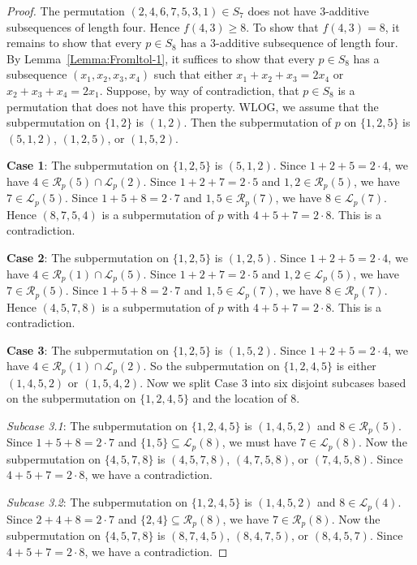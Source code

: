 \documentclass[10pt,a4paper]{amsart}
\begin{document}
\begin{proof}
The permutation $(2,4,6,7,5,3,1)\in S_7$ does not have $3$-additive subsequences of length four. Hence $f(4,3)\geq8$. To show that $f(4,3)=8$, it remains to show that every $p\in S_8$ has a $3$-additive subsequence of length four. By Lemma~\ref{Lemma:Fromltol-1}, it suffices to show that every $p\in S_8$ has a subsequence $(x_1,x_2,x_3,x_4)$ such that either $x_1+x_2+x_3=2x_4$ or $x_2+x_3+x_4=2x_1$.  Suppose, by way of contradiction, that $p\in S_8$ is a permutation that does not have this property. WLOG, we assume that the subpermutation on $\{1,2\}$ is $(1,2)$. Then the subpermutation of $p$ on $\{1,2,5\}$ is $(5,1,2)$, $(1,2,5)$, or $(1,5,2)$.

\textbf{Case 1}: The subpermutation on $\{1,2,5\}$ is $(5,1,2)$. Since $1+2+5=2\cdot4$, we have $4\in\mathcal{R}_p(5)\cap\mathcal{L}_p(2)$. Since $1+2+7=2\cdot5$ and $1,2\in\mathcal{R}_p(5)$, we have $7\in\mathcal{L}_p(5)$. Since $1+5+8=2\cdot7$ and $1,5\in\mathcal{R}_p(7)$, we have $8\in\mathcal{L}_p(7)$. Hence $(8,7,5,4)$ is a subpermutation of $p$ with $4+5+7=2\cdot8$. This is a contradiction.

\textbf{Case 2}: The subpermutation on $\{1,2,5\}$ is $(1,2,5)$. Since $1+2+5=2\cdot4$, we have $4\in\mathcal{R}_p(1)\cap\mathcal{L}_p(5)$. Since $1+2+7=2\cdot5$ and $1,2\in\mathcal{L}_p(5)$, we have $7\in\mathcal{R}_p(5)$. Since $1+5+8=2\cdot7$ and $1,5\in\mathcal{L}_p(7)$, we have $8\in\mathcal{R}_p(7)$. Hence $(4,5,7,8)$ is a subpermutation of $p$ with $4+5+7=2\cdot8$. This is a contradiction.

\textbf{Case 3}: The subpermutation on $\{1,2,5\}$ is $(1,5,2)$. Since $1+2+5=2\cdot4$, we have $4\in\mathcal{R}_p(1)\cap\mathcal{L}_p(2)$. So the subpermutation on $\{1,2,4,5\}$ is either $(1,4,5,2)$ or $(1,5,4,2)$. Now we split Case 3 into six disjoint subcases based on the subpermutation on $\{1,2,4,5\}$ and the location of $8$.

\textit{Subcase 3.1}: The subpermutation on $\{1,2,4,5\}$ is $(1,4,5,2)$ and $8\in\mathcal{R}_p(5)$. Since $1+5+8=2\cdot7$ and $\{1,5\}\subseteq\mathcal{L}_p(8)$, we must have $7\in\mathcal{L}_p(8)$. Now the subpermutation on $\{4,5,7,8\}$ is $(4,5,7,8)$, $(4,7,5,8)$, or $(7,4,5,8)$. Since $4+5+7=2\cdot8$, we have a contradiction.

\textit{Subcase 3.2}: The subpermutation on $\{1,2,4,5\}$ is $(1,4,5,2)$ and $8\in\mathcal{L}_p(4)$. Since $2+4+8=2\cdot7$ and $\{2,4\}\subseteq\mathcal{R}_p(8)$, we have $7\in\mathcal{R}_p(8)$. Now the subpermutation on $\{4,5,7,8\}$ is $(8,7,4,5)$, $(8,4,7,5)$, or $(8,4,5,7)$. Since $4+5+7=2\cdot8$, we have a contradiction.


\end{proof}
\end{document}
